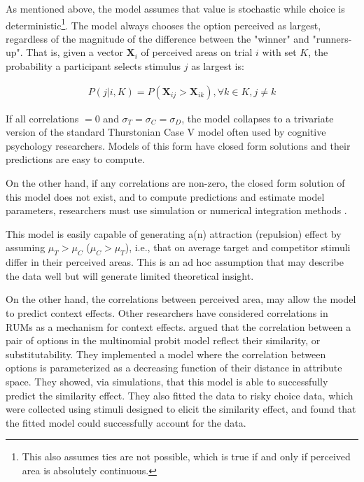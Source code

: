 As mentioned above, the model assumes that value is stochastic while choice is deterministic\footnote{This also assumes ties are not possible, which is true if and only if perceived area is absolutely continuous.}. The model always chooses the option perceived as largest, regardless of the magnitude of the difference between the "winner" and "runners-up". That is, given a vector $\mathbf{X}_i$ of perceived areas on trial $i$ with set $K$, the probability a participant selects stimulus $j$ as largest is:

\begin{align}
   P(j|i,K)=P(\mathbf{X}_{ij}>\mathbf{X}_{ik}), \forall k \in K, j \neq k
   \label{eqn:pchoice}
\end{align}

If all correlations $=0$ and $\sigma_{T}=\sigma_{C}=\sigma_{D}$, the model collapses to a trivariate version of the standard Thurstonian Case V model \parencite{thurstone1927law} often used by cognitive psychology researchers. Models of this form have closed form solutions and their predictions are easy to compute.

On the other hand, if any correlations are non-zero, the closed form solution of this model does not exist, and to compute predictions and estimate model parameters, researchers must use simulation or numerical integration methods \parencite{train2009discrete}. 

This model is easily capable of generating a(n) attraction (repulsion) effect by assuming $\mu_{T}>\mu_{C}$ ($\mu_{C}>\mu_{T}$), i.e., that on average target and competitor stimuli differ in their perceived areas. This is an ad hoc assumption that may describe the data well but will generate limited theoretical insight. 

On the other hand, the correlations between perceived area, may allow the model to predict context effects. Other researchers have considered correlations in RUMs as a mechanism for context effects. \textcite{kamakura1984predicting} argued that the correlation between a pair of options in the multinomial probit model reflect their similarity, or substitutability. They implemented a model where the correlation between options is parameterized as a decreasing function of their distance in attribute space. They showed, via simulations, that this model is able to successfully predict the similarity effect. They also fitted the data to risky choice data, which were collected using stimuli designed to elicit the similarity effect, and found that the fitted model could successfully account for the data. 

